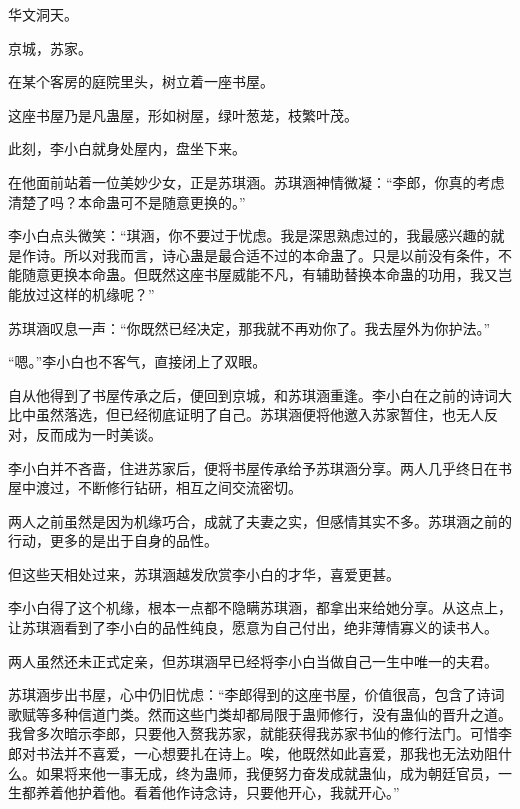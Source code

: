 
\begin{this_body}



华文洞天。

京城，苏家。

在某个客房的庭院里头，树立着一座书屋。

这座书屋乃是凡蛊屋，形如树屋，绿叶葱茏，枝繁叶茂。

此刻，李小白就身处屋内，盘坐下来。

在他面前站着一位美妙少女，正是苏琪涵。苏琪涵神情微凝：“李郎，你真的考虑清楚了吗？本命蛊可不是随意更换的。”

李小白点头微笑：“琪涵，你不要过于忧虑。我是深思熟虑过的，我最感兴趣的就是作诗。所以对我而言，诗心蛊是最合适不过的本命蛊了。只是以前没有条件，不能随意更换本命蛊。但既然这座书屋威能不凡，有辅助替换本命蛊的功用，我又岂能放过这样的机缘呢？”

苏琪涵叹息一声：“你既然已经决定，那我就不再劝你了。我去屋外为你护法。”

“嗯。”李小白也不客气，直接闭上了双眼。

自从他得到了书屋传承之后，便回到京城，和苏琪涵重逢。李小白在之前的诗词大比中虽然落选，但已经彻底证明了自己。苏琪涵便将他邀入苏家暂住，也无人反对，反而成为一时美谈。

李小白并不吝啬，住进苏家后，便将书屋传承给予苏琪涵分享。两人几乎终日在书屋中渡过，不断修行钻研，相互之间交流密切。

两人之前虽然是因为机缘巧合，成就了夫妻之实，但感情其实不多。苏琪涵之前的行动，更多的是出于自身的品性。

但这些天相处过来，苏琪涵越发欣赏李小白的才华，喜爱更甚。

李小白得了这个机缘，根本一点都不隐瞒苏琪涵，都拿出来给她分享。从这点上，让苏琪涵看到了李小白的品性纯良，愿意为自己付出，绝非薄情寡义的读书人。

两人虽然还未正式定亲，但苏琪涵早已经将李小白当做自己一生中唯一的夫君。

苏琪涵步出书屋，心中仍旧忧虑：“李郎得到的这座书屋，价值很高，包含了诗词歌赋等多种信道门类。然而这些门类却都局限于蛊师修行，没有蛊仙的晋升之道。我曾多次暗示李郎，只要他入赘我苏家，就能获得我苏家书仙的修行法门。可惜李郎对书法并不喜爱，一心想要扎在诗上。唉，他既然如此喜爱，那我也无法劝阻什么。如果将来他一事无成，终为蛊师，我便努力奋发成就蛊仙，成为朝廷官员，一生都养着他护着他。看着他作诗念诗，只要他开心，我就开心。”


\end{this_body}

